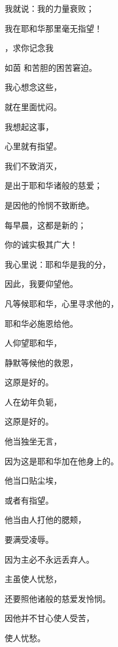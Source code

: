 {\par }{\Q {}我就说：我的力量衰败；
\par }{\Q 我在耶和华那里毫无指望！
\par }{\BB \par }{\Q {}，求你记念我
\par }{\Q 如茵 和苦胆的困苦窘迫。
\par }{\Q {}我心想念这些，
\par }{\Q 就在里面忧闷。
\par }{\Q {}我想起这事，
\par }{\Q 心里就有指望。
\par }{\BB \par }{\Q {}我们不致消灭，
\par }{\Q 是出于耶和华诸般的慈爱；
\par }{\Q 是因他的怜悯不致断绝。
\par }{\Q {}每早晨，这都是新的；
\par }{\Q 你的诚实极其广大！
\par }{\Q {}我心里说：耶和华是我的分，
\par }{\Q 因此，我要仰望他。
\par }{\BB \par }{\Q {}凡等候耶和华，心里寻求他的，
\par }{\Q 耶和华必施恩给他。
\par }{\Q {}人仰望耶和华，
\par }{\Q 静默等候他的救恩，
\par }{\Q 这原是好的。
\par }{\Q {}人在幼年负轭，
\par }{\Q 这原是好的。
\par }{\BB \par }{\Q {}他当独坐无言，
\par }{\Q 因为这是耶和华加在他身上的。
\par }{\Q {}他当口贴尘埃，
\par }{\Q 或者有指望。
\par }{\Q {}他当由人打他的腮颊，
\par }{\Q 要满受凌辱。
\par }{\BB \par }{\Q {}因为主必不永远丢弃人。
\par }{\Q {}主虽使人忧愁，
\par }{\Q 还要照他诸般的慈爱发怜悯。
\par }{\Q {}因他并不甘心使人受苦，
\par }{\Q 使人忧愁。
}
